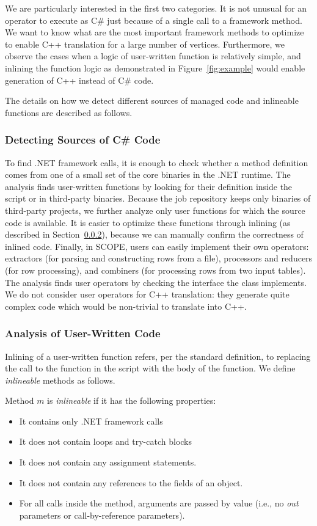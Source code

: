 We are particularly interested in the first two categories. It is not unusual for an operator to execute as C\# just because of a single call to a framework method.
We want to know what are the most important framework methods to optimize to enable C++ translation for a large number of vertices. Furthermore, we observe the cases when a logic of user-written function is relatively simple, and inlining the function logic as demonstrated in Figure~\ref{fig:example} would enable generation of C++ instead of C\# code. 

The details on how we detect different sources of managed code and inlineable functions are described as follows.

\subsubsection{Detecting Sources of C\# Code}
To find .NET framework calls, it is enough to check whether a method definition comes from one of a small set of the core binaries in the .NET runtime. The analysis finds user-written functions by looking for their definition inside the script or in third-party binaries. Because the job repository keeps only binaries of third-party projects, we further analyze only user functions for which the source code is available. It is easier to optimize these functions through inlining (as described in Section~\ref{sec:analysisUser}), because we can manually confirm the correctness of inlined code. Finally, in SCOPE, users can easily implement their own operators: extractors (for parsing and constructing rows from a file), processors and reducers (for row processing), and combiners (for processing rows from two input tables). The analysis finds user operators by checking the interface the class implements. We do not consider user operators for C++ translation: they generate quite complex code which would be non-trivial to translate into C++.


\subsubsection{Analysis of User-Written Code}
\label{sec:analysisUser}
Inlining of a user-written function refers, per the standard definition, to replacing the call to the function in the script with the body of the function.
We define \emph{inlineable} methods as follows.
\begin{definition}
Method $m$ is \emph{inlineable} if it has the following properties:
\begin{itemize}
\item It contains only .NET framework calls
\item It does not contain loops and try-catch blocks
\item It does not contain any assignment statements.
\item It does not contain any references to the fields of an object.
\item For all calls inside the method, arguments are passed by value (i.e., no {\em out} parameters or call-by-reference parameters).
\end{itemize}
\end{definition}

